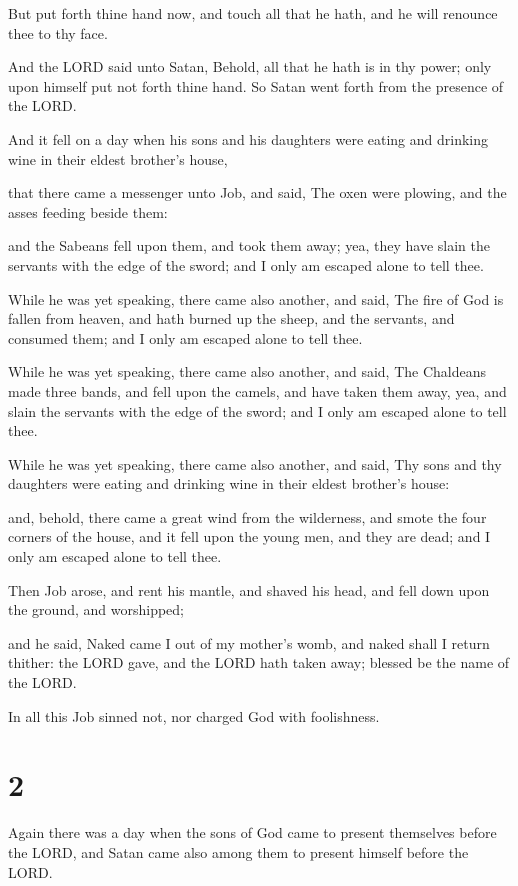 \documentclass[12pt,oneside]{book}
\begin{document}
But put forth thine hand now, and touch all that he hath, and he will renounce thee to thy face.

And the LORD said unto Satan, Behold, all that he hath is in thy power; only upon himself put not forth thine hand. So Satan went forth from the presence of the LORD.

And it fell on a day when his sons and his daughters were eating and drinking wine in their eldest brother's house,

that there came a messenger unto Job, and said, The oxen were plowing, and the asses feeding beside them:

and the Sabeans fell upon them, and took them away; yea, they have slain the servants with the edge of the sword; and I only am escaped alone to tell thee.

While he was yet speaking, there came also another, and said, The fire of God is fallen from heaven, and hath burned up the sheep, and the servants, and consumed them; and I only am escaped alone to tell thee.

While he was yet speaking, there came also another, and said, The Chaldeans made three bands, and fell upon the camels, and have taken them away, yea, and slain the servants with the edge of the sword; and I only am escaped alone to tell thee.

While he was yet speaking, there came also another, and said, Thy sons and thy daughters were eating and drinking wine in their eldest brother's house:

and, behold, there came a great wind from the wilderness, and smote the four corners of the house, and it fell upon the young men, and they are dead; and I only am escaped alone to tell thee.

Then Job arose, and rent his mantle, and shaved his head, and fell down upon the ground, and worshipped;

and he said, Naked came I out of my mother's womb, and naked shall I return thither: the LORD gave, and the LORD hath taken away; blessed be the name of the LORD.

In all this Job sinned not, nor charged God with foolishness.

\chapter{2}
Again there was a day when the sons of God came to present themselves before the LORD, and Satan came also among them to present himself before the LORD.
\end{document}
